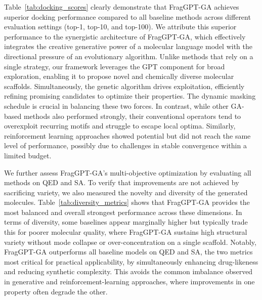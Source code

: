 \documentclass[lettersize,journal]{IEEEtran}
\begin{document}
Table~\ref{tab:docking_scores} clearly demonstrate that FragGPT-GA achieves superior docking performance compared to all baseline methods across different evaluation settings (top-1, top-10, and top-100). We attribute this superior performance to the synergistic architecture of FragGPT-GA, which effectively integrates the creative generative power of a molecular language model with the directional pressure of an evolutionary algorithm. Unlike methods that rely on a single strategy, our framework leverages the GPT component for broad exploration, enabling it to propose novel and chemically diverse molecular scaffolds. Simultaneously, the genetic algorithm drives exploitation, efficiently refining promising candidates to optimize their properties. The dynamic masking schedule is crucial in balancing these two forces. In contrast, while other GA-based methods also performed strongly, their conventional operators tend to overexploit recurring motifs and struggle to escape local optima. Similarly, reinforcement learning approaches showed potential but did not reach the same level of performance, possibly due to challenges in stable convergence within a limited budget. 

We further assess FragGPT-GA’s multi-objective optimization by evaluating all methods on QED and SA. To verify that improvements are not achieved by sacrificing variety, we also measured the novelty and diversity of the generated molecules. Table~\ref{tab:diversity_metrics} shows that FragGPT-GA provides the most balanced and overall strongest performance across these dimensions. In terms of diversity, some baselines appear marginally higher but typically trade this for poorer molecular quality, where FragGPT-GA sustains high structural variety without mode collapse or over-concentration on a single scaffold. Notably, FragGPT-GA outperforms all baseline models on QED and SA, the two metrics most critical for practical applicability, by simultaneously enhancing drug-likeness and reducing synthetic complexity. This avoids the common imbalance observed in generative and reinforcement-learning approaches, where improvements in one property often degrade the other. 


\end{document}
